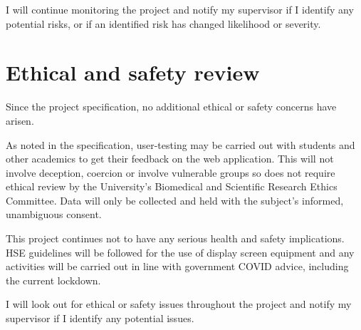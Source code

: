 \documentclass[12pt]{article}
\begin{document}
I will continue monitoring the project and notify my supervisor if I identify any potential risks, or if an identified risk has changed likelihood or severity.

\section{Ethical and safety review}

Since the project specification, no additional ethical or safety concerns have arisen.

As noted in the specification, user-testing may be carried out with students and other academics to get their feedback on the web application. This will not involve deception, coercion or involve vulnerable groups so does not require ethical review by the University’s Biomedical and Scientific Research Ethics Committee. Data will only be collected and held with the subject's informed, unambiguous consent.

This project continues not to have any serious health and safety implications. HSE guidelines will be followed for the use of display screen equipment and any activities will be carried out in line with government COVID advice, including the current lockdown.

I will look out for ethical or safety issues throughout the project and notify my supervisor if I identify any potential issues.




\end{document}
